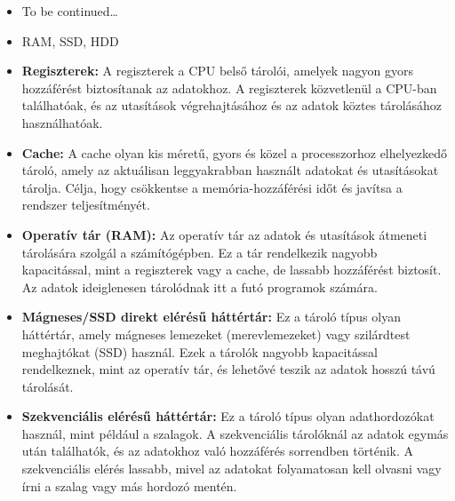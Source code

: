 \documentclass[12pt,a4paper]{article}
\begin{document}
            \begin{tcolorbox}[colback=blue!5!white,colframe=blue!50!black,title= 11. Ismertesse a D tároló felépítését és működését!]
                \begin{itemize}
                    \item To be continued…
                \end{itemize}
            \end{tcolorbox}

            \begin{tcolorbox}[colback=blue!5!white,colframe=blue!50!black,title= 12. Melyik tároló tartalmaz a számítógépben D tárolót?]
                \begin{itemize}
                    \item RAM, SSD, HDD
                \end{itemize}
            \end{tcolorbox}
            
            \begin{tcolorbox}[colback=blue!5!white,colframe=blue!50!black,title= 13. Ismertesse a tárolók hierarchia szintjeit!]
                \begin{itemize}
                    \item \textbf{Regiszterek:} A regiszterek a CPU belső tárolói, amelyek nagyon gyors hozzáférést biztosítanak az adatokhoz. A regiszterek közvetlenül a CPU-ban találhatóak, és az utasítások végrehajtásához és az adatok köztes tárolásához használhatóak.
                    \item \textbf{Cache:} A cache olyan kis méretű, gyors és közel a processzorhoz elhelyezkedő tároló, amely az aktuálisan leggyakrabban használt adatokat és utasításokat tárolja. Célja, hogy csökkentse a memória-hozzáférési időt és javítsa a rendszer teljesítményét.
                    \item \textbf{Operatív tár (RAM):} Az operatív tár az adatok és utasítások átmeneti tárolására szolgál a számítógépben. Ez a tár rendelkezik nagyobb kapacitással, mint a regiszterek vagy a cache, de lassabb hozzáférést biztosít. Az adatok ideiglenesen tárolódnak itt a futó programok számára.
                    \item \textbf{Mágneses/SSD direkt elérésű háttértár:} Ez a tároló típus olyan háttértár, amely mágneses lemezeket (merevlemezeket) vagy szilárdtest meghajtókat (SSD) használ. Ezek a tárolók nagyobb kapacitással rendelkeznek, mint az operatív tár, és lehetővé teszik az adatok hosszú távú tárolását.
                    \item \textbf{Szekvenciális elérésű háttértár:} Ez a tároló típus olyan adathordozókat használ, mint például a szalagok. A szekvenciális tárolóknál az adatok egymás után találhatók, és az adatokhoz való hozzáférés sorrendben történik. A szekvenciális elérés lassabb, mivel az adatokat folyamatosan kell olvasni vagy írni a szalag vagy más hordozó mentén.
                \end{itemize}
            \end{tcolorbox}
            
\end{document}
